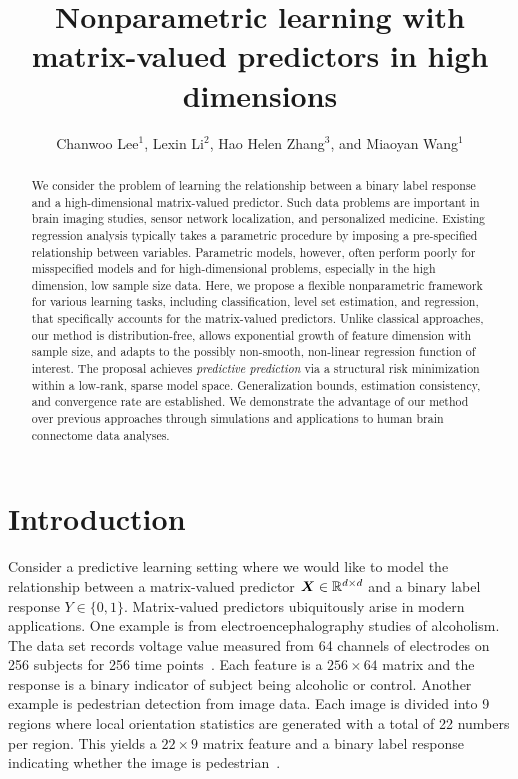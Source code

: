 \documentclass[mathptm]{statsoc}
\title[Nonparametric learning with matrix predictors]{Nonparametric learning with matrix-valued predictors in high dimensions}
\author[Lee {\it et al.}]{Chanwoo Lee$^{1}$, Lexin Li$^2$, Hao Helen Zhang$^3$, and Miaoyan Wang$^1$}
\begin{document}
\maketitle

\begin{abstract}
We consider the problem of learning the relationship between a binary label response and a high-dimensional matrix-valued predictor. Such data problems are important in brain imaging studies, sensor network localization, and personalized medicine. Existing regression analysis typically takes a parametric procedure by imposing a pre-specified relationship between variables. Parametric models, however, often perform poorly for misspecified models and for high-dimensional problems, especially in the high dimension, low sample size data. Here, we propose a flexible nonparametric framework for various learning tasks, including classification, level set estimation, and regression, that specifically accounts for the matrix-valued predictors. Unlike classical approaches, our method is distribution-free, allows exponential growth of feature dimension with sample size, and adapts to the possibly non-smooth, non-linear regression function of interest. The proposal achieves \emph{predictive prediction} via a structural risk minimization within a low-rank, sparse model space. Generalization bounds, estimation consistency, and convergence rate are established. We demonstrate the advantage of our method over previous approaches through simulations and applications to human brain connectome data analyses. 
\end{abstract}



\section{Introduction}
Consider a predictive learning setting where we would like to model the relationship between a matrix-valued predictor $\bm X \in \mathbb{R}^{d\times d}$ and a binary label response $Y\in\{0,1\}$. Matrix-valued predictors ubiquitously arise in modern applications. One example is from electroencephalography studies of alcoholism. The data set records voltage value measured from 64 channels of electrodes on 256 subjects for 256 time points~\citep{zhou2014regularized}. Each feature is a $256\times 64$ matrix and the response is a binary indicator of subject being alcoholic or control. Another example is pedestrian detection from image data. Each image is divided into 9 regions where local orientation statistics are generated with a total of 22 numbers per region. This yields a $22 \times 9$ matrix feature and a binary label response indicating whether the image is pedestrian~\citep{Shashua2004PedestrianDF}. 
\end{document}

